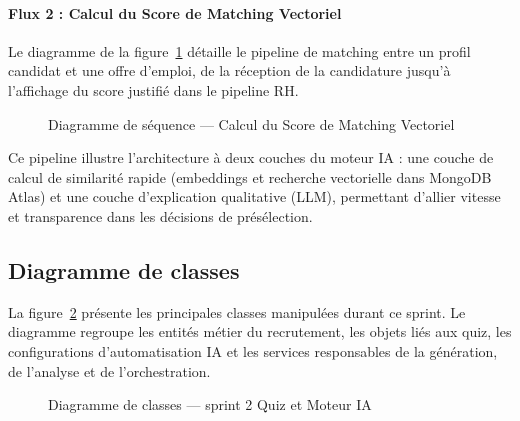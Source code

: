 \paragraph{Flux 2 : Calcul du Score de Matching Vectoriel}
Le diagramme de la figure~\ref{fig:seq_matching} détaille le pipeline de matching entre un profil candidat et une offre d'emploi, de la réception de la candidature jusqu'à l'affichage du score justifié dans le pipeline RH.

\begin{figure}[H]
    \centering
    \caption{Diagramme de séquence — Calcul du Score de Matching Vectoriel}
    \label{fig:seq_matching}
\end{figure}

Ce pipeline illustre l'architecture à deux couches du moteur IA : une couche de calcul de similarité rapide (embeddings et recherche vectorielle dans MongoDB Atlas) et une couche d'explication qualitative (LLM), permettant d'allier vitesse et transparence dans les décisions de présélection.

\subsection{Diagramme de classes}

La figure~\ref{fig:sprint3_class_diagram} présente les principales classes manipulées durant ce sprint. Le diagramme regroupe les entités métier du recrutement, les objets liés aux quiz, les configurations d'automatisation IA et les services responsables de la génération, de l'analyse et de l'orchestration.

\begin{figure}[H]
    \centering
    \caption{Diagramme de classes — sprint 2 Quiz et Moteur IA}
    \label{fig:sprint3_class_diagram}
\end{figure}

